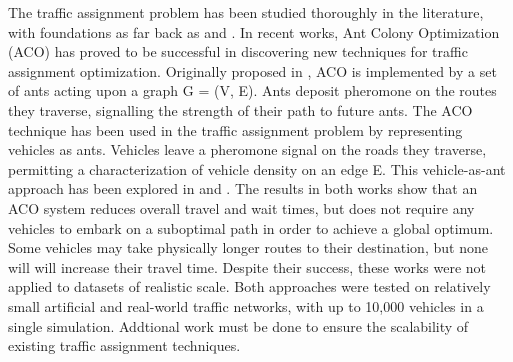 \documentclass[conference]{IEEEtran}
\begin{document}
The traffic assignment problem has been studied thoroughly in the literature, with foundations as far back as \cite{knight} and \cite{wardrop}. In recent works, Ant Colony Optimization (ACO) has proved to be successful in discovering new techniques for traffic assignment optimization. Originally proposed in \cite{dorigo}, ACO is implemented by a set of ants acting upon a graph G = (V, E). Ants deposit pheromone on the routes they traverse, signalling the strength of their path to future ants. The ACO technique has been used in the traffic assignment problem by representing vehicles as ants. Vehicles leave a pheromone signal on the roads they traverse, permitting a characterization of vehicle density on an edge E. This vehicle-as-ant approach has been explored in \cite{iaco} and \cite{dtpos}. The results in both works show that an ACO system reduces overall travel and wait times, but does not require any vehicles to embark on a suboptimal path in order to achieve a global optimum. Some vehicles may take physically longer routes to their destination, but none will will increase their travel time. Despite their success, these works were not applied to datasets of realistic scale. Both approaches were tested on relatively small artificial and real-world traffic networks, with up to 10,000 vehicles in a single simulation. Addtional work must be done to ensure the scalability of existing traffic assignment techniques.
\end{document}
